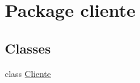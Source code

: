 \hypertarget{namespacecliente}{}\section{Package cliente}
\label{namespacecliente}
\subsection*{Classes}
\begin{DoxyCompactItemize}
\item 
class \hyperlink{classcliente_1_1Cliente}{Cliente}
\end{DoxyCompactItemize}
